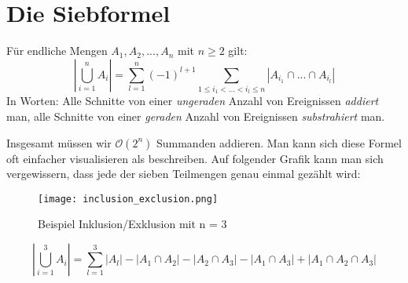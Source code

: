 \chapter{Die Siebformel}

\begin{satz}
    Für endliche Mengen $A_1, A_2, ... , A_n$ mit $ n \geq 2$ gilt:
    $$\left\lvert \bigcup^{n}_{i = 1} A_i \right\rvert = \sum_{l = 1}^{n}(-1)^{l+1} \sum_{1 \leq i_1 < ... < i_l \leq n} \left\lvert A_{i_1} \cap ... \cap A_{i_l}\right\rvert$$
    In Worten: Alle Schnitte von einer \textit{ungeraden} Anzahl von Ereignissen \textit{addiert} man, alle Schnitte
    von einer \textit{geraden} Anzahl von Ereignissen \textit{substrahiert} man.
\end{satz}
\bigskip

Insgesamt müssen wir $\mathcal{O}(2^n)$ Summanden addieren. Man kann sich diese Formel oft einfacher visualisieren als beschreiben. Auf folgender Grafik
kann man sich vergewissern, dass jede der sieben Teilmengen genau einmal gezählt wird:

\begin{figure}[h]
    \centering
    \texttt{[image: inclusion\_exclusion.png]}
    \caption{Beispiel Inklusion/Exklusion mit n = 3}
\end{figure}

$$\left\lvert \bigcup^{3}_{i = 1} A_i \right\rvert = \sum_{l = 1}^{3}\left\lvert A_l\right\rvert - \left\lvert A_1 \cap A_2 \right\rvert - \left\lvert A_2 \cap A_3 \right\rvert - \left\lvert A_1 \cap A_3 \right\rvert + \left\lvert A_1 \cap A_2 \cap A_3\right\rvert$$